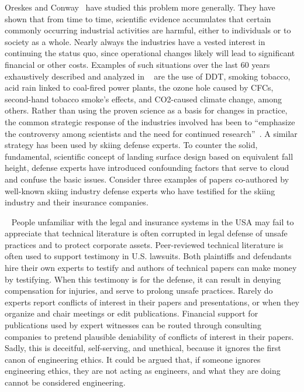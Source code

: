 \documentclass[smallextended]{svjour3}       %
\begin{document}
Oreskes and Conway~\cite{Oreskes2010} have studied this problem more generally.  They have shown that from time to time, scientific evidence accumulates that certain commonly occurring industrial activities are harmful, either to individuals or to society as a whole. Nearly always the industries have a vested interest in continuing the status quo, since operational changes likely will lead to significant financial or other costs. Examples of such situations over the last 60 years exhaustively described and analyzed in ~\cite{Oreskes2010} are the use of DDT, smoking tobacco, acid rain linked to coal-fired power plants, the ozone hole caused by CFCs, second-hand tobacco smoke’s effects, and CO2-caused climate change, among others. Rather than using the proven science as a basis for changes in practice, the common strategic response of the industries involved has been to “emphasize the controversy among scientists and the need for continued research”~\cite{Oreskes2010}. A similar strategy has been used by skiing defense experts. To counter the solid, fundamental, scientific concept of landing surface design based on equivalent fall height, defense experts have introduced confounding factors
that serve to cloud and confuse the basic issues.  Consider three examples of
papers co-authored by well-known skiing industry defense experts who have
testified for the skiing industry and their insurance companies.

~
People unfamiliar with the legal and insurance systems in the USA may fail to
appreciate that technical literature is often corrupted in legal defense of
unsafe practices and to protect corporate assets. Peer-reviewed technical
literature is often used to support testimony in U.S. lawsuits. Both plaintiffs
and defendants hire their own experts to testify and authors of technical
papers can make money by testifying. When this testimony is for the defense, it
can result in denying compensation for injuries, and serve to prolong unsafe
practices. Rarely do experts report conflicts of interest in their papers and
presentations, or when they organize and chair meetings or edit publications.
Financial support for publications used by expert witnesses can be routed
through consulting companies to pretend plausible deniability of conflicts of
interest in their papers. Sadly, this is deceitful, self-serving, and
unethical, because it ignores the first canon of engineering ethics. It could
be argued that, if someone ignores engineering ethics, they are not acting as
engineers, and what they are doing cannot be considered engineering.
\end{document}

